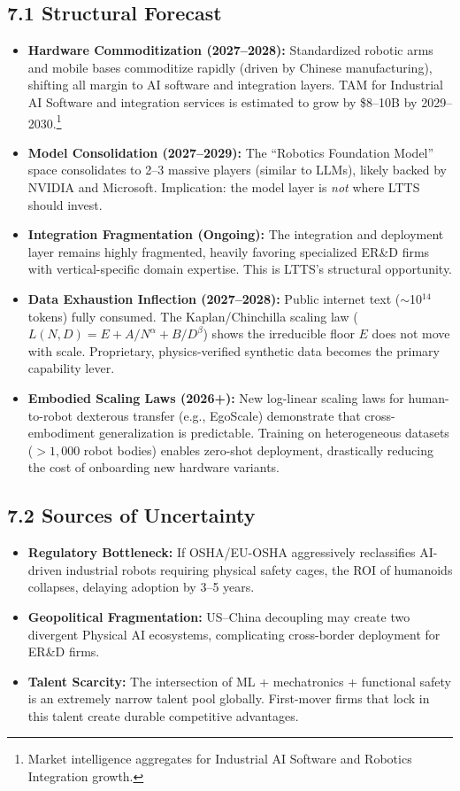 \documentclass[11pt,a4paper]{article}
\begin{document}
\subsection{7.1 Structural Forecast}
\begin{itemize}
    \item \textbf{Hardware Commoditization (2027--2028):} Standardized robotic arms and mobile bases commoditize rapidly (driven by Chinese manufacturing), shifting all margin to AI software and integration layers. TAM for Industrial AI Software and integration services is estimated to grow by \$8--10B by 2029--2030.\footnote{Market intelligence aggregates for Industrial AI Software and Robotics Integration growth.}
    \item \textbf{Model Consolidation (2027--2029):} The ``Robotics Foundation Model'' space consolidates to 2--3 massive players (similar to LLMs), likely backed by NVIDIA and Microsoft. Implication: the model layer is \textit{not} where LTTS should invest.
    \item \textbf{Integration Fragmentation (Ongoing):} The integration and deployment layer remains highly fragmented, heavily favoring specialized ER\&D firms with vertical-specific domain expertise. This is LTTS's structural opportunity.
    \item \textbf{Data Exhaustion Inflection (2027--2028):} Public internet text ($\sim$10$^{14}$ tokens) fully consumed. The Kaplan/Chinchilla scaling law ($L(N,D) = E + A/N^\alpha + B/D^\beta$) shows the irreducible floor $E$ does not move with scale. Proprietary, physics-verified synthetic data becomes the primary capability lever.
    \item \textbf{Embodied Scaling Laws (2026+):} New log-linear scaling laws for human-to-robot dexterous transfer (e.g., EgoScale) demonstrate that cross-embodiment generalization is predictable. Training on heterogeneous datasets ($>1,000$ robot bodies) enables zero-shot deployment, drastically reducing the cost of onboarding new hardware variants.
\end{itemize}

\subsection{7.2 Sources of Uncertainty}
\begin{itemize}
    \item \textbf{Regulatory Bottleneck:} If OSHA/EU-OSHA aggressively reclassifies AI-driven industrial robots requiring physical safety cages, the ROI of humanoids collapses, delaying adoption by 3--5 years.
    \item \textbf{Geopolitical Fragmentation:} US--China decoupling may create two divergent Physical AI ecosystems, complicating cross-border deployment for ER\&D firms.
    \item \textbf{Talent Scarcity:} The intersection of ML + mechatronics + functional safety is an extremely narrow talent pool globally. First-mover firms that lock in this talent create durable competitive advantages.
\end{itemize}
\end{document}
